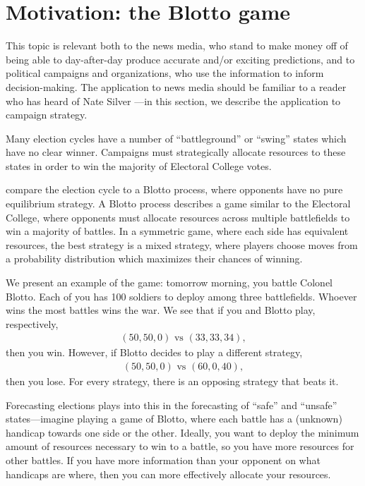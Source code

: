 \documentclass[thesis.tex]{subfiles}
\begin{document}
\section{Motivation: the Blotto game}

This topic is relevant both to the news media, who stand to make money off of being able to day-after-day produce accurate and/or exciting predictions, and to political campaigns and organizations, who use the information to inform decision-making. The application to news media should be familiar to a reader who has heard of Nate Silver \citeyearpar{Silver:2012aa}---in this section, we describe the application to campaign strategy.

Many election cycles have a number of ``battleground'' or ``swing'' states which have no clear winner. Campaigns must strategically allocate resources to these states in order to win the majority of Electoral College votes.

\cite{Merolla:2005aa} compare the election cycle to a Blotto process, where opponents have no pure equilibrium strategy. A Blotto process describes a game similar to the Electoral College, where opponents must allocate resources across multiple battlefields to win a majority of battles. In a symmetric game, where each side has equivalent resources, the best strategy is a mixed strategy, where players choose moves from a probability distribution which maximizes their chances of winning.

We present an example of the game: tomorrow morning, you battle Colonel Blotto. Each of you has 100 soldiers to deploy among three battlefields. Whoever wins the most battles wins the war. We see that if you and Blotto play, respectively, \begin{equation*}\begin{aligned}
	(50, 50, 0) \text{ vs } (33, 33, 34),
\end{aligned}\end{equation*} then you win. However, if Blotto decides to play a different strategy, \begin{equation*}\begin{aligned}
	(50, 50, 0) \text{ vs } (60, 0, 40),
\end{aligned}\end{equation*} then you lose. For every strategy, there is an opposing strategy that beats it.

Forecasting elections plays into this in the forecasting of ``safe'' and ``unsafe'' states---imagine playing a game of Blotto, where each battle has a (unknown) handicap towards one side or the other. Ideally, you want to deploy the minimum amount of resources necessary to win to a battle, so you have more resources for other battles. If you have more information than your opponent on what handicaps are where, then you can more effectively allocate your resources.
\end{document}
